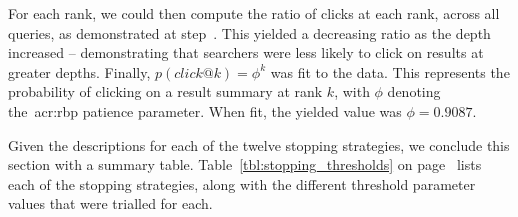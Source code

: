 For each rank, we could then compute the ratio of clicks at each rank, across all queries, as demonstrated at step~. This yielded a decreasing ratio as the depth increased -- demonstrating that searchers were less likely to click on results at greater depths. Finally, $p(click@k) = \phi^k$ was fit to the data. This represents the probability of clicking on a result summary at rank $k$, with $\phi$ denoting the~\gls{acr:rbp} patience parameter. When fit, the yielded value was $\phi=0.9087$.

Given the descriptions for each of the twelve stopping strategies, we conclude this section with a summary table. Table~\ref{tbl:stopping_thresholds} on page~\pageref{tbl:stopping_thresholds} lists each of the stopping strategies, along with the different threshold parameter values that were trialled for each.

